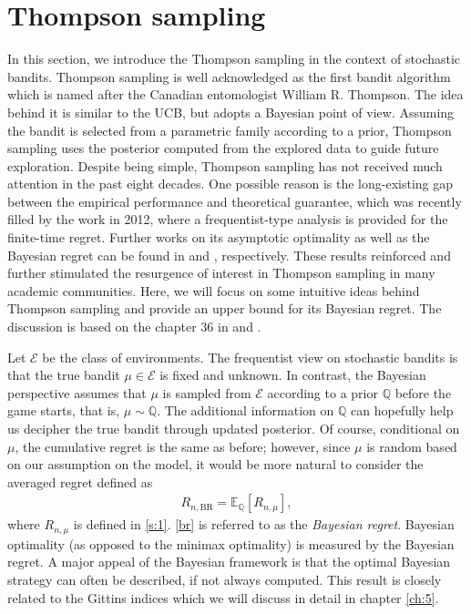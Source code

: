 \documentclass[10pt, openright]{book}
\numberwithin{equation}{section}
\theoremstyle{plain}
\theoremstyle{definition}
\def\Q{{\mathbb Q}}
\def\E{{\mathbb E}}
\def\BR{{\text{BR}}}
\begin{document}
\section{Thompson sampling}

In this section, we introduce the Thompson sampling in the context of stochastic bandits. Thompson sampling \cite{Thompson_1933} is well acknowledged as the first bandit algorithm which is named after the Canadian entomologist William R. Thompson. 
The idea behind it is similar to the UCB, but adopts a Bayesian point of view. Assuming the bandit is selected from a parametric family according to a prior, Thompson sampling uses the posterior computed from the explored data to guide future exploration. 
Despite being simple, Thompson sampling has not received much attention in the past eight decades. One possible reason is the long-existing gap between the empirical performance and theoretical guarantee, which was recently filled by the work \cite{agrawal2012analysis} in 2012, where a frequentist-type analysis is provided for the finite-time regret.  Further works on its asymptotic optimality as well as the Bayesian regret can be found in \cite{Kaufmann_2012} and \cite{Russo_2014}, respectively. These results reinforced and further stimulated the resurgence of interest in Thompson sampling in many academic communities. Here, we will focus on some intuitive ideas behind Thompson sampling and provide an upper bound for its Bayesian regret. The discussion is based on the chapter 36 in \cite{lattimore2018bandit} and \cite{Russo_2014}. 

Let $\mathcal E$ be the class of environments. The frequentist view on stochastic bandits is that the true bandit $\mu\in\mathcal E$ is fixed and unknown. In contrast, the Bayesian perspective assumes that $\mu$ is sampled from $\mathcal E$ according to a prior $\Q$ before the game starts, that is, $\mu\sim\Q$. The additional information on $\Q$ can hopefully help us decipher the true bandit through updated posterior. Of course, conditional on $\mu$, the cumulative regret is the same as before; however, since $\mu$ is random based on our assumption on the model, it would be more natural to consider the averaged regret defined as
\begin{align}
R_{n, \BR}=\E_\Q[R_{n,\mu}],\label{br}
\end{align}
where $R_{n,\mu}$ is defined in \eqref{s:1}. \eqref{br} is referred to as the \emph{Bayesian regret}. Bayesian optimality (as opposed to the minimax optimality) is measured by the Bayesian regret. A major appeal of the Bayesian framework is that the optimal Bayesian strategy can often be described, if not always computed. This result is closely related to the Gittins indices which we will discuss in detail in chapter \ref{ch:5}.
\end{document}
